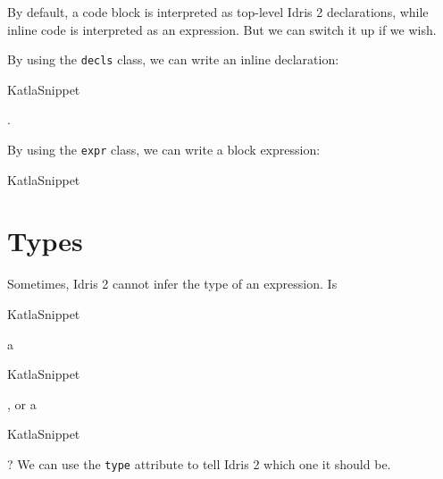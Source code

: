By default, a code block is interpreted as top-level Idris 2
declarations, while inline code is interpreted as an expression. But we
can switch it up if we wish.

By using the \texttt{decls} class, we can write an inline declaration:
\let\KatlaSnippet\relax{}\newcommand\KatlaSnippet[1][]{\UseVerb[#1]{KatlaSnippet}}
\begin{SaveVerbatim}[commandchars=\\\{\}]{KatlaSnippet}
\KatlaSpace{}\IdrisKeyword{:}\KatlaSpace{}\KatlaSpace{}\IdrisKeyword{\KatlaDash{}>}\KatlaSpace{}\KatlaNewline{}
\end{SaveVerbatim}
\KatlaSnippet{}.

By using the \texttt{expr} class, we can write a block expression:

\let\KatlaSnippet\relax{}\newcommand\KatlaSnippet[1][]{\UseVerbatim[#1]{KatlaSnippet}}
\begin{SaveVerbatim}[commandchars=\\\{\}]{KatlaSnippet}
\IdrisData{[}\KatlaNewline{}
\KatlaSpace{}\KatlaSpace{}\KatlaSpace{}\KatlaSpace{}\KatlaNewline{}
\KatlaSpace{}\KatlaSpace{}\KatlaSpace{}\KatlaSpace{}\KatlaNewline{}
\KatlaSpace{}\KatlaSpace{}\KatlaSpace{}\KatlaSpace{}\KatlaNewline{}
\IdrisData{]}\KatlaNewline{}
\end{SaveVerbatim}
\KatlaSnippet{}

\hypertarget{types}{%
\section{Types}\label{types}}

Sometimes, Idris 2 cannot infer the type of an expression. Is
\let\KatlaSnippet\relax{}\newcommand\KatlaSnippet[1][]{\UseVerb[#1]{KatlaSnippet}}
\begin{SaveVerbatim}[commandchars=\\\{\}]{KatlaSnippet}
\IdrisData{[1,}\KatlaSpace{}\KatlaSpace{}\IdrisData{3]}\KatlaNewline{}
\end{SaveVerbatim}
\KatlaSnippet{} a
\let\KatlaSnippet\relax{}\newcommand\KatlaSnippet[1][]{\UseVerb[#1]{KatlaSnippet}}
\begin{SaveVerbatim}[commandchars=\\\{\}]{KatlaSnippet}
\KatlaSpace{}\KatlaNewline{}
\end{SaveVerbatim}
\KatlaSnippet{}, or a
\let\KatlaSnippet\relax{}\newcommand\KatlaSnippet[1][]{\UseVerb[#1]{KatlaSnippet}}
\begin{SaveVerbatim}[commandchars=\\\{\}]{KatlaSnippet}
\KatlaSpace{}\KatlaSpace{}\KatlaNewline{}
\end{SaveVerbatim}
\KatlaSnippet{}? We can use the \texttt{type} attribute to tell Idris 2
which one it should be.

